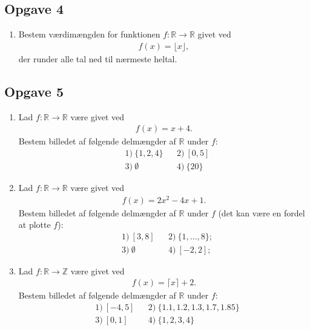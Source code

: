 \subsection*{Opgave 4}
\begin{enumerate}
	\item Bestem værdimængden for funktionen $f:\mathbb{R} \to \mathbb{R}$ givet ved
	\begin{align*}
		f(x) = \lfloor x \rfloor,
	\end{align*}
	der runder alle tal ned til nærmeste heltal. 
\end{enumerate}

\subsection*{Opgave 5}
\begin{enumerate}[label=\roman*)]
\item Lad $f:\mathbb{R} \to \mathbb{R}$ være givet ved
\begin{align*}
f(x) = x + 4.
\end{align*}
Bestem billedet af følgende delmængder af $\mathbb{R}$ under $f$:
\begin{align*}
&1) \ \{1,2,4\} &&2) \ [0,5]\\
&3) \ \emptyset &&4) \ \{20\}
\end{align*}
\item Lad $f: \mathbb{R} \to \mathbb{R}$ være givet ved 
\begin{align*}
f(x) = 2x^2-4x+1.
\end{align*}
Bestem billedet af følgende delmængder af $\mathbb{R}$ under $f$ (det kan være en fordel at plotte $f$):
\begin{align*}
&1)\  [3,8] &&2) \  \{1,\hdots, 8\};\\
&3)\  \emptyset &&4)\ [-2,2];
\end{align*}
\item Lad $f:\mathbb{R} \to \mathbb{Z}$ være givet ved
\begin{align*}
f(x) = \lceil x \rceil + 2.
\end{align*}
Bestem billedet af følgende delmængder af $\mathbb{R}$ under $f$:
\begin{align*}
&1) \ [-4,5]  &&2) \ \{1.1,1.2,1.3,1.7,1.85\}\\
&3) \ [0,1]  &&4) \ \{1,2,3,4\}\\
\end{align*}
\end{enumerate}

